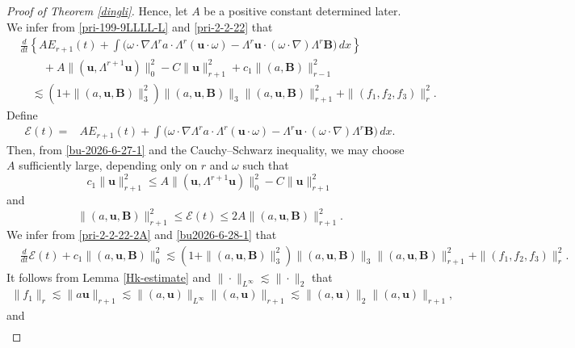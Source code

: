 \documentclass[12pt, reqno]{amsart}
\numberwithin{equation}{section}
\numberwithin{equation}{section}
\numberwithin{equation}{section}
\numberwithin{equation}{section}
\theoremstyle{remark}
\def\u{ \mathbf{u} }
\def\b{ \mathbf{B} }
\begin{document}
\begin{proof}[Proof of Theorem \ref{dingli}]
Hence, let
 $A$ be a positive  constant determined later. We infer from \eqref{pri-199-9LLLL-L} and \eqref{pri-2-2-22} that
\begin{equation}\label{pri-2-2-22-2A}
\begin{split}
&\frac{d}{dt}\left\{AE_{r+1}(t)+\int \Big(\omega\cdot\nabla\Lambda^{r}a\cdot\Lambda^{r}(\u\cdot\omega)-\Lambda^{r}\u\cdot(\omega\cdot\nabla)\Lambda^{r}\b\Big) \,dx\right\}\\
&\quad\quad+A\|(\u,\Lambda^{r+1}\u)\|_{0}^2-C\|\u\|_{r+1}^2+c_1\|(a,\b)\|_{r-1}^2\\
&\quad\lesssim (1+\|(a,\u,\b)\|^2_3)\|(a,\u,\b)\|_3\|(a,\u,\b)\|^2_{r+1}+\|(f_1,f_2,f_3)\|_{r}^{2}.
\end{split}\end{equation}
Define
\begin{align*}%
{\mathcal{E}(t)}=&AE_{r+1}(t)+\int \Big(\omega\cdot\nabla\Lambda^{r}a\cdot\Lambda^{r}(\u\cdot\omega)-\Lambda^{r}\u\cdot(\omega\cdot\nabla)\Lambda^{r}\b\Big) \,dx.
\end{align*}
Then, from \eqref{bu-2026-6-27-1} and the
Cauchy--Schwarz inequality,  we may choose $A$ sufficiently large, depending only on $r$ and $\omega$ such that
\begin{equation}\label{bu2026-6-28-1}c_1\|\u\|_{r+1}^2\leq A\|(\u,\Lambda^{r+1}\u)\|_{0}^2-C\|\u\|^2_{r+1}
\end{equation} and
\begin{equation}\label{bu2026-6-28-2}
\|(a,\u,\b)\|^2_{r+1}\leq {\mathcal{E}(t)}\leq 2A\|(a,\u,\b)\|^2_{r+1}.
\end{equation}
We infer from \eqref{pri-2-2-22-2A} and \eqref{bu2026-6-28-1} that
\begin{equation}\label{bu-pri-2-2-22-2A}
\begin{split}
&\frac{d}{dt}{\mathcal{E}(t)}+c_1\|(a,\u,\b)\|_{0}^2\lesssim (1+\|(a,\u,\b)\|^2_3)\|(a,\u,\b)\|_3\|(a,\u,\b)\|^2_{r+1}+\|(f_1,f_2,f_3)\|_{r}^{2}.
\end{split}\end{equation}
It follows from Lemma \ref{Hk-estimate} and $\|\cdot\|_{L^\infty}\lesssim\|\cdot\|_2$ that
\begin{equation}\begin{split}\label{4.6AAAA}
\|f_1\|_{r}\lesssim\|a\u\|_{r+1}\lesssim\|(a,\u)\|_{L^\infty}\|(a,\u)\|_{r+1}\lesssim\|(a,\u)\|_{2}\|(a,\u)\|_{r+1},
\end{split}\end{equation}
and
\begin{equation}\begin{split}\label{bu4.7AAAA}

\end{split}
\end{equation}
\end{proof}
\end{document}
